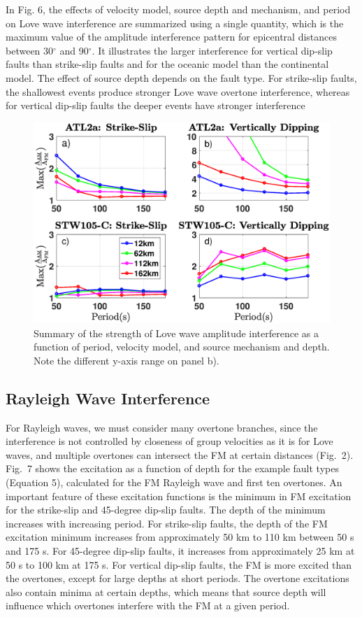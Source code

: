 \documentclass[extra,mreferee]{gji}
\begin{document}
 
In Fig. 6, the effects of velocity model, source depth and mechanism, and period on Love wave interference are summarized using a single quantity, which is the maximum value of the amplitude interference pattern for epicentral distances between 30$^\circ$ and 90$^\circ$. It illustrates the larger interference for vertical dip-slip faults than strike-slip faults and for the oceanic model than the continental model. The effect of source depth depends on the fault type. For strike-slip faults, the shallowest events produce stronger Love wave overtone interference, whereas for vertical dip-slip faults the deeper events have stronger interference
 
  \begin{figure}
 \includegraphics[width=1.0\textwidth]{Fig6_Sver.eps}
 \caption{Summary of the strength of Love wave amplitude interference as a function of period, velocity model, and source mechanism and depth. Note the different y-axis range on panel b). }
 \end{figure}

\subsection{Rayleigh Wave Interference}

 For Rayleigh waves, we must consider many overtone branches, since the interference is not controlled by closeness of group velocities as it is for Love waves, and multiple overtones can intersect the FM at certain distances (Fig.\ 2). Fig.\ 7 shows the excitation as a function of depth for the example fault types (Equation 5), calculated for the FM Rayleigh wave and first ten overtones. An important feature of these excitation functions is the minimum in FM excitation for the strike-slip and 45-degree dip-slip faults. The depth of the minimum increases with increasing period. For strike-slip faults, the depth of the FM excitation minimum increases from approximately 50 km to 110 km between 50 s and 175 s. For 45-degree dip-slip faults, it increases from approximately 25 km at 50 s to 100 km at 175 s. For vertical dip-slip faults, the FM is more excited than the overtones, except for large depths at short periods. The  overtone excitations also contain minima at certain depths, which means that source depth will influence which overtones interfere with the FM at a given period.  
 
\end{document}
